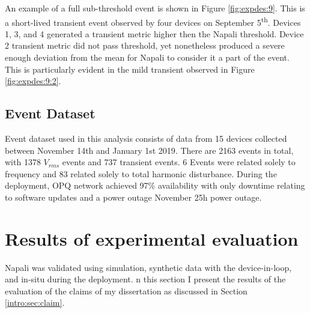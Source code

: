 An example of a full sub-threshold event is shown in Figure \ref{fig:expdes:9}.
This is a short-lived transient event observed by four devices on September 5\textsuperscript{th}.
Devices 1, 3, and 4 generated a transient metric higher then the Napali threshold.
Device 2 transient metric did not pass threshold, yet nonetheless produced a severe enough deviation from the mean for Napali to consider it a part of the event.
This is particularly evident in the mild transient observed in Figure \ref{fig:expdes:9:2}.

\subsection{Event Dataset}\label{subsec:event-dataset}
Event dataset used in this analysis consists of data from 15 devices collected between November 14th and January 1st 2019.
There are 2163 events in total, with 1378 $V_{rms}$ events and  737 transient events.
6 Events were related solely to frequency and 83 related solely to total harmonic disturbance.
During the deployment, OPQ network achieved 97\% availability with only downtime relating to software updates and a power outage November 25h power outage.


\clearpage

\section{Results of experimental evaluation}\label{sec:napali-validation}

Napali was validated using simulation, synthetic data with the device-in-loop, and in-situ during the deployment.
n this section I present the results of the evaluation of the claims of my dissertation as discussed in Section \ref{intro:sec:claim}.

